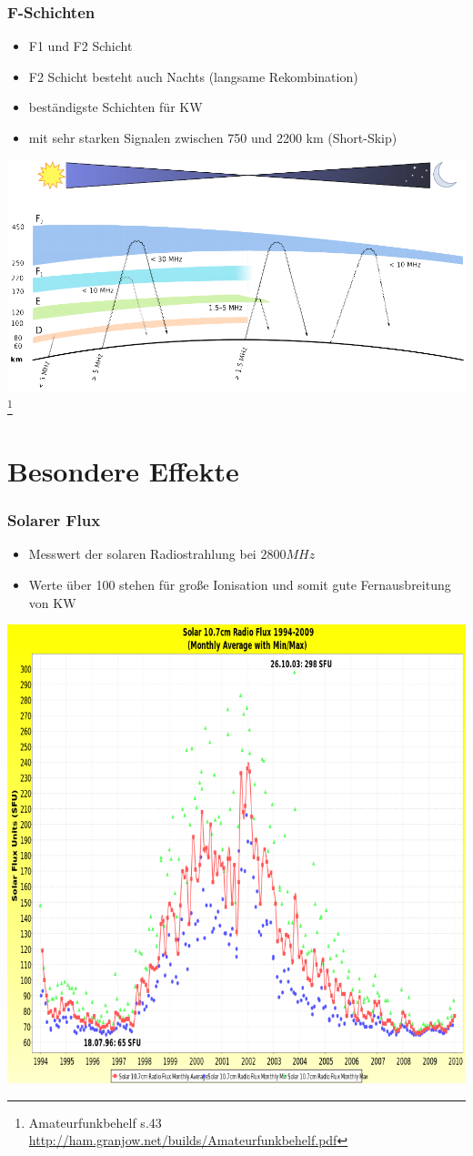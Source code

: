 \begin{frame}
    \frametitle{F-Schichten}
    \begin{itemize}
    			\item F1 und F2 Schicht
				\item F2 Schicht besteht auch Nachts (langsame Rekombination)
       		 	\item beständigste Schichten für KW
       		 	\item mit sehr starken Signalen zwischen 750 und 2200 km (Short-Skip)
    \end{itemize}
	\begin{center}
        \includegraphics[width=.75\textwidth,height=.5\textheight,keepaspectratio]{a08/schichten_behelf_43.png}
        \footnote{\tiny Amateurfunkbehelf s.43 \url{http://ham.granjow.net/builds/Amateurfunkbehelf.pdf}}
    \end{center}
\end{frame}

\section*{Besondere Effekte}

\begin{frame}
    \frametitle{Solarer Flux}
    \begin{itemize}
    			\item Messwert der solaren Radiostrahlung bei $2800 MHz$
				\item Werte über 100 stehen für große Ionisation und somit gute Fernausbreitung von KW
    \end{itemize}
    \begin{center}
        \includegraphics[width=.7\textwidth,height=.7\textheight,keepaspectratio]{a08/Solar_10_7_cm_Radio_Flux.png}
    \end{center}
\end{frame}

